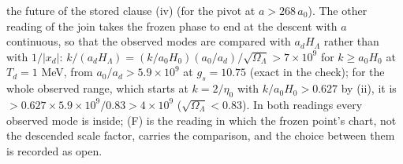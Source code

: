 the future of the stored clause (iv) (for the pivot at $a > 268\,a_{0}$). The other reading of the join takes the frozen phase to end at the descent with $a$ continuous, so that the observed modes are compared with $a_{d}H_{\Lambda}$ rather than with $1/|x_{d}|$: $k/(a_{d}H_{\Lambda}) = (k/a_{0}H_{0})(a_{0}/a_{d})/\sqrt{\Omega_{\Lambda}} > 7 \times 10^{9}$ for $k \ge a_{0}H_{0}$ at $T_{d} = 1$ MeV, from $a_{0}/a_{d} > 5.9 \times 10^{9}$ at $g_{s} = 10.75$ (exact in the check); for the whole observed range, which starts at $k = 2/\eta_{0}$ with $k/a_{0}H_{0} > 0.627$ by (ii), it is $> 0.627 \times 5.9 \times 10^{9}/0.83 > 4 \times 10^{9}$ ($\sqrt{\Omega_{\Lambda}} < 0.83$). In both readings every observed mode is inside; (F) is the reading in which the frozen point's chart, not the descended scale factor, carries the comparison, and the choice between them is recorded as open.


